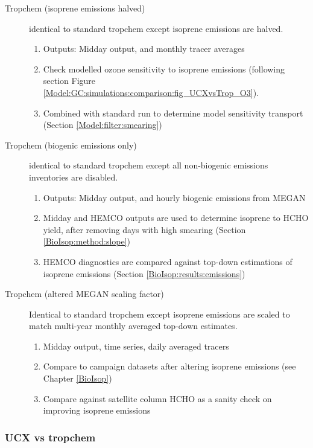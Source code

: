 \begin{description}
        \item [Tropchem (isoprene emissions halved)]%
          identical to standard tropchem except isoprene emissions are halved.
          \begin{enumerate}
            \item Outputs: Midday output, and monthly tracer averages 
            \item Check modelled ozone sensitivity to isoprene emissions (following section Figure \ref{Model:GC:simulations:comparison:fig_UCXvsTrop_O3}).
            \item Combined with standard run to determine model sensitivity transport (Section \ref{Model:filter:smearing})
          \end{enumerate}
        
        \item [Tropchem (biogenic emissions only)]%
          identical to standard tropchem except all non-biogenic emissions inventories are disabled.
          \begin{enumerate}
            \item Outputs: Midday output, and hourly biogenic emissions from MEGAN
            \item Midday and HEMCO outputs are used to determine isoprene to HCHO yield, after removing days with high smearing (Section \ref{BioIsop:method:slope})
            \item HEMCO diagnostics are compared against top-down estimations of isoprene emissions (Section \ref{BioIsop:results:emissions})
          \end{enumerate}
        
        \item [Tropchem (altered MEGAN scaling factor)]%
          Identical to standard tropchem except isoprene emissions are scaled to match multi-year monthly averaged top-down estimates.
          \begin{enumerate}
            \item Midday output, time series, daily averaged tracers
            \item Compare to campaign datasets after altering isoprene emissions (see Chapter \ref{BioIsop})
            \item Compare against satellite column HCHO as a sanity check on improving isoprene emissions
          \end{enumerate}
      \end{description}
    
    \subsubsection{UCX vs tropchem}
      \label{Model:GC:simulations:comparison}
      
